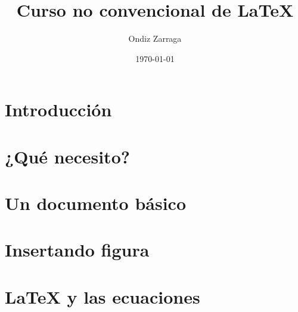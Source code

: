 \documentclass[a4paper,10pt]{book}
\title{Curso no convencional de \LaTeX}
\author{Ondiz Zarraga}
\date{\today}
\begin{document}
\maketitle

\hypersetup{linkcolor=black}


\tableofcontents
\listoftables
\listoffigures

\chapter{Introducción}


\chapter{¿Qué necesito?}


\chapter{Un documento básico}


\chapter{Insertando figura}


\chapter{LaTeX y las ecuaciones}



% 
%
\end{document}
